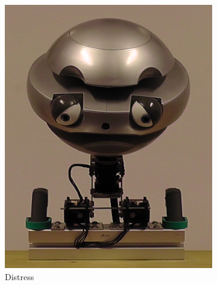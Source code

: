 \begin{figure}[ht]
    \begin{subfigure}{0.2\columnwidth}
        \includegraphics[width=\columnwidth]{images/gbe/distress.jpg}
        \caption{Distress}
    \end{subfigure}
    \begin{subfigure}{0.2\columnwidth}

\end{subfigure}
\end{figure}
